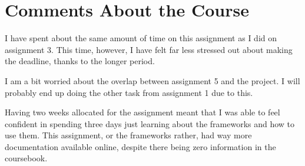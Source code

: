 \documentclass[a4paper]{scrartcl}
\begin{document}
\section{Comments About the Course}

I have spent about the same amount of time on this assignment as I did on assignment 3. This time, however, I have felt far less stressed out about making the deadline, thanks to the longer period.

I am a bit worried about the overlap between assignment 5 and the project. I will probably end up doing the other task from assignment 1 due to this.

Having two weeks allocated for the assignment meant that I was able to feel confident in spending three days just learning about the frameworks and how to use them. This assignment, or the frameworks rather, had way more documentation available online, despite there being zero information in the coursebook.
\end{document}
